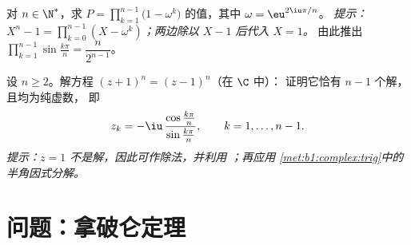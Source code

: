 \begin{exercise}[$\star\star\star$]\label{exo:b1:complex:11}
对 $n \in \N^*$，求 $P = \prod_{k=1}^{n-1}
\bigl(1 - \omega^k\bigr)$ 的值，其中 $\omega = \eu^{2\iu\pi/n}$。
\emph{提示：$X^n - 1 = \prod_{k=0}^{n-1} (X - \omega^k)$；两边除以
$X - 1$ 后代入 $X = 1$。} 由此推出
$\prod_{k=1}^{n-1} \sin\frac{k\pi}{n} = \dfrac{n}{2^{n-1}}$。
\end{exercise}

\begin{exercise}[$\star\star$]\label{exo:b1:complex:12}
设 $n \geq 2$。解方程 $(z + 1)^n = (z - 1)^n$（在 $\C$ 中）：
证明它恰有 $n - 1$ 个解，且均为纯虚数，
即
\[
z_k = -\iu\,\frac{\cos\frac{k\pi}{n}}{\sin\frac{k\pi}{n}},
\qquad k = 1, \dots, n - 1 .
\]
\emph{提示：$z = 1$ 不是解，因此可作除法，并利用
；再应用
\cref{met:b1:complex:trig}中的半角因式分解。}
\end{exercise}

\section{问题：拿破仑定理}

